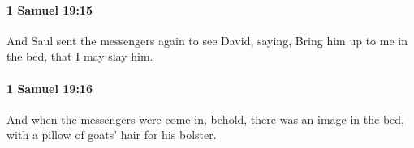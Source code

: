 		\paragraph{1 Samuel 19:15} %
			\label{1SAMUEL-19-15}

			And Saul sent the messengers again to see David, saying, Bring him up to me in the bed, that I may slay him.


		\paragraph{1 Samuel 19:16} %
			\label{1SAMUEL-19-16}

			And when the messengers were come in, behold, there was an image in the bed, with a pillow of goats’ hair for his bolster.


